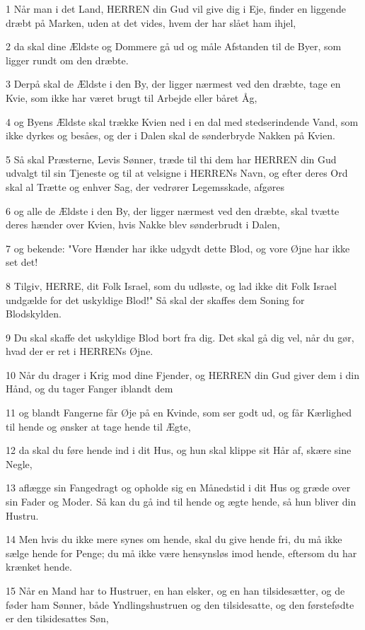 \par 1 Når man i det Land, HERREN din Gud vil give dig i Eje, finder en liggende dræbt på Marken, uden at det vides, hvem der har slået ham ihjel,
\par 2 da skal dine Ældste og Dommere gå ud og måle Afstanden til de Byer, som ligger rundt om den dræbte.
\par 3 Derpå skal de Ældste i den By, der ligger nærmest ved den dræbte, tage en Kvie, som ikke har været brugt til Arbejde eller båret Åg,
\par 4 og Byens Ældste skal trække Kvien ned i en dal med stedserindende Vand, som ikke dyrkes og besåes, og der i Dalen skal de sønderbryde Nakken på Kvien.
\par 5 Så skal Præsterne, Levis Sønner, træde til thi dem har HERREN din Gud udvalgt til sin Tjeneste og til at velsigne i HERRENs Navn, og efter deres Ord skal al Trætte og enhver Sag, der vedrører Legemsskade, afgøres
\par 6 og alle de Ældste i den By, der ligger nærmest ved den dræbte, skal tvætte deres hænder over Kvien, hvis Nakke blev sønderbrudt i Dalen,
\par 7 og bekende: "Vore Hænder har ikke udgydt dette Blod, og vore Øjne har ikke set det!
\par 8 Tilgiv, HERRE, dit Folk Israel, som du udløste, og lad ikke dit Folk Israel undgælde for det uskyldige Blod!" Så skal der skaffes dem Soning for Blodskylden.
\par 9 Du skal skaffe det uskyldige Blod bort fra dig. Det skal gå dig vel, når du gør, hvad der er ret i HERRENs Øjne.
\par 10 Når du drager i Krig mod dine Fjender, og HERREN din Gud giver dem i din Hånd, og du tager Fanger iblandt dem
\par 11 og blandt Fangerne får Øje på en Kvinde, som ser godt ud, og får Kærlighed til hende og ønsker at tage hende til Ægte,
\par 12 da skal du føre hende ind i dit Hus, og hun skal klippe sit Hår af, skære sine Negle,
\par 13 aflægge sin Fangedragt og opholde sig en Månedstid i dit Hus og græde over sin Fader og Moder. Så kan du gå ind til hende og ægte hende, så hun bliver din Hustru.
\par 14 Men hvis du ikke mere synes om hende, skal du give hende fri, du må ikke sælge hende for Penge; du må ikke være hensynsløs imod hende, eftersom du har krænket hende.
\par 15 Når en Mand har to Hustruer, en han elsker, og en han tilsidesætter, og de føder ham Sønner, både Yndlingshustruen og den tilsidesatte, og den førstefødte er den tilsidesattes Søn,
